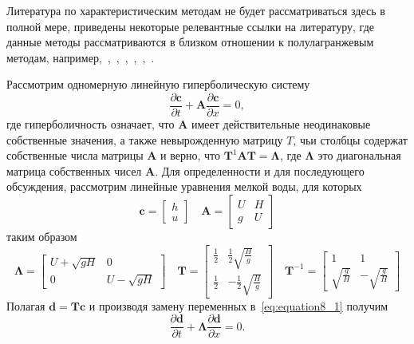 Литература по характеристическим методам не будет рассматриваться здесь в полной мере, приведены некоторые релевантные ссылки на литературу, где данные методы рассматриваются в близком отношении к полулагранжевым методам, например,~\cite{A17},~\cite{A18},~\cite{A19},~\cite{A41},~\cite{A42},~\cite{A44}.

Рассмотрим одномерную линейную гиперболическую систему
%
\begin{equation}
\label{eq:equation8_1}
\frac{\partial\mathbf{c}}{\partial t} + \mathbf{A}\frac{\partial \mathbf{c}}{\partial{x}} = 0,
\end{equation}
%
где гиперболичность означает, что $\mathbf{A}$ имеет действительные неодинаковые собственные значения, а также невырожденную матрицу $T$, чьи столбцы содержат собственные числа матрицы $\mathbf{A}$ и верно, что 
$\mathbf{T}^1\mathbf{A}\mathbf{T}=\mathbf{\Lambda}$, где $\mathbf{\Lambda}$ это диагональная матрица собственных чисел $\mathbf{A}$. Для определенности и для последующего обсуждения, рассмотрим линейные уравнения мелкой воды, для которых
%
\begin{equation*}
\mathbf{c} = \begin{bmatrix}
h \\
u
\end{bmatrix}
 \quad
\mathbf{A} = \begin{bmatrix}
	U & H\\
	g & U
\end{bmatrix}
\end{equation*}
%
таким образом
%
\begin{equation*}
\mathbf{\Lambda} = \begin{bmatrix}
U + \sqrt{gH} & 0\\
0 & U - \sqrt{gH}
\end{bmatrix}
\quad
\mathbf{T} = \begin{bmatrix}
\frac{1}{2} & \frac{1}{2}\sqrt{\frac{H}{g}}\\
\frac{1}{2}  & -\frac{1}{2} \sqrt{\frac{H}{g}}
\end{bmatrix}
\quad
\mathbf{T}^{-1} = \begin{bmatrix}
1 & 1\\
\sqrt{\frac{g}{H}}  & -\sqrt{\frac{g}{H}}
\end{bmatrix}
\end{equation*}
%
Полагая $\mathbf{d}=\mathbf{T}\mathbf{c}$ и производя замену переменных в~\eqref{eq:equation8_1} получим
%
\begin{equation}
\label{eq:equation8_2}
\frac{\partial\mathbf{d}}{\partial t} + \mathbf{\Lambda}\frac{\partial \mathbf{d}}{\partial{x}} = 0.
\end{equation}

